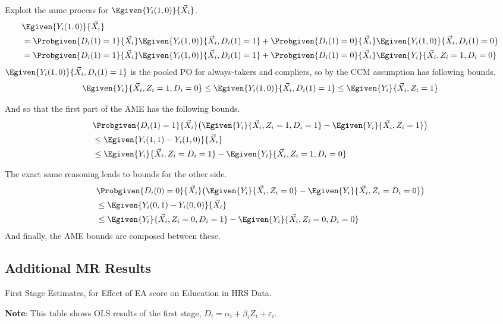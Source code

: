 Exploit the same process for $\Egiven{Y_i(1,0)}{\vec X_i}$.
\begin{align*}
    &\Egiven{Y_i(1,0)}{\vec X_i} \\
    &=
    \Probgiven{D_i(1) = 1}{\vec X_i }
        \Egiven{Y_i(1,0)}{\vec X_i, D_i(1) = 1}
    + \Probgiven{D_i(1) = 0}{\vec X_i }
        \Egiven{Y_i(1,0)}{\vec X_i, D_i(1) = 0} \\
    &=
    \Probgiven{D_i(1) = 1}{\vec X_i }
        \Egiven{Y_i(1,0)}{\vec X_i, D_i(1) = 1}
    + \Probgiven{D_i(1) = 0}{\vec X_i }
        \Egiven{Y_i}{\vec X_i, Z_i = 1, D_i = 0}
\end{align*}
$\Egiven{Y_i(1,0)}{\vec X_i, D_i(1) = 1}$ is the pooled PO for always-takers and compliers, so by the CCM assumption has following bounds.
\[
    \Egiven{Y_i}{\vec X_i, Z_i = 1, D_i = 0}
    \leq 
    \Egiven{Y_i(1,0)}{\vec X_i, D_i(1) = 1} 
    \leq 
    \Egiven{Y_i}{\vec X_i, Z_i = 1}
\]

And so that the first part of the AME has the following bounds.
\begin{align*}
    &\Probgiven{D_i(1) = 1}{\vec X_i } \big( 
        \Egiven{Y_i}{\vec X_i, Z_i = 1, D_i = 1}
        - \Egiven{Y_i}{\vec X_i, Z_i = 1}
    \big) \\
    &\leq
    \Egiven{Y_i(1,1) - Y_i(1,0)}{\vec X_i} \\
    &\leq
    \Egiven{Y_i}{\vec X_i, Z_i = D_i = 1}
        - \Egiven{Y_i}{\vec X_i, Z_i = 1, D_i = 0}
\end{align*}

The exact same reasoning leads to bounds for the other side.
\begin{align*}
    &\Probgiven{D_i(0) = 0}{\vec X_i } \big( 
        \Egiven{Y_i}{\vec X_i, Z_i = 0}
        - \Egiven{Y_i}{\vec X_i, Z_i = D_i = 0}
    \big) \\
    &\leq
    \Egiven{Y_i(0,1) - Y_i(0,0)}{\vec X_i} \\
    &\leq
    \Egiven{Y_i}{\vec X_i, Z_i = 0, D_i = 1}
        - \Egiven{Y_i}{\vec X_i, Z_i = 0, D_i = 0}
\end{align*}
And finally, the AME bounds are composed between these.

\subsection{Additional MR Results}

\begin{table}[H]
    \singlespacing
    \small
    \centering
    \caption{First Stage Estimates, for Effect of EA score on Education in HRS Data.}
    \makebox[\textwidth][c]{}
    \label{tab:firststage-reg}
    \justify
    \footnotesize
    \textbf{Note}:
    This table shows OLS results of the first stage, $D_i = \alpha_i + \beta_i Z_i + \varepsilon_i$.
\end{table}

